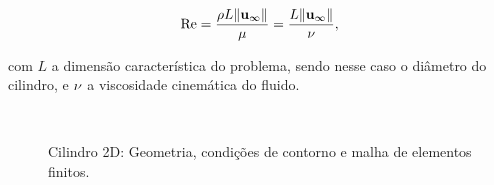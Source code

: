 \documentclass[tese_patricia]{subfiles}%
\begin{document}
\begin{align}
	\mathrm{Re} = \frac{\rho L \lVert\mathbf{u}_{\infty}\lVert}{\mu} = \frac{L \lVert \mathbf{u}_{\infty} \lVert}{\nu}, \label{eq:Reynolds}
\end{align}

\noindent com $L$ a dimensão característica do problema, sendo nesse caso o diâmetro do cilindro, e $\nu$ a viscosidade cinemática do fluido. 

\begin{figure}[!htb]
	\centering
	\\
	\caption{Cilindro 2D: Geometria, condições de contorno e malha de elementos finitos.}
\end{figure}
\end{document}
